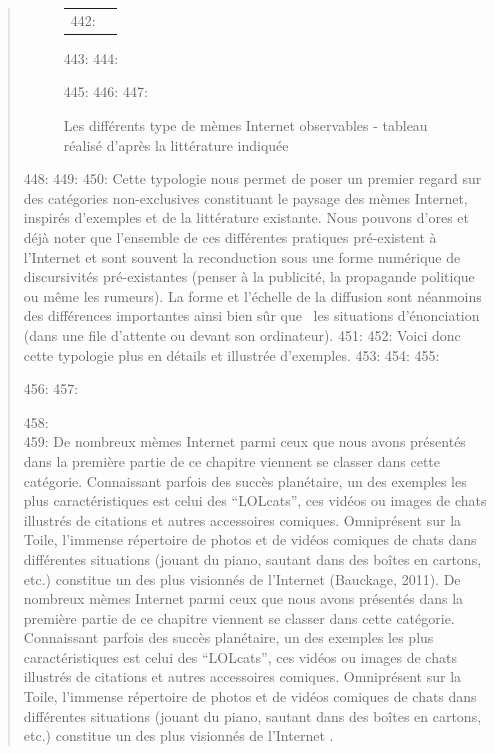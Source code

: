 \begin{quote}
\begin{figure}
\begin{tabular}{c|c}
442:     \end{tabular}
443: 
444: \caption[Typologie des mèmes]{Les diff\'erents type de m\`emes Internet observables - tableau r\'ealis\'e d{\textquoteright}apr\`es la litt\'erature indiqu\'ee}
445: \label{fig:typologie-memes}
446: 
447: \end{figure}
448: 
449: 
450: Cette typologie nous permet de poser un premier regard sur des cat\'egories non-exclusives constituant le paysage des m\`emes Internet, inspir\'es d{\textquoteright}exemples et de la litt\'erature existante. Nous pouvons d{\textquoteright}ores et d\'ej\`a noter que l{\textquoteright}ensemble de ces diff\'erentes pratiques pr\'e-existent \`a l{\textquoteright}Internet et sont souvent la reconduction sous une forme num\'erique de discursivit\'es pr\'e-existantes (penser \`a la publicit\'e, la propagande politique ou m\^eme les rumeurs). La forme et l{\textquoteright}\'echelle de la diffusion sont n\'eanmoins des diff\'erences importantes ainsi bien s\^ur que \ les situations d{\textquoteright}\'enonciation (dans une file d{\textquoteright}attente ou devant son ordinateur). 
451: 
452: Voici donc cette typologie plus en d\'etails et illustr\'ee d{\textquoteright}exemples. 
453: 
454: 
455: \begin{description}
456: 
457: \item[Absurdiste, humour]
458: \hfill \\
459: De nombreux m\`emes Internet parmi ceux que nous avons pr\'esent\'es dans la premi\`ere partie de ce chapitre viennent se classer dans cette cat\'egorie. Connaissant parfois des succ\`es plan\'etaire, un des exemples les plus caract\'eristiques est celui des {\textquotedblleft}LOLcats{\textquotedblright}, ces vid\'eos ou images de chats illustr\'es de citations et autres accessoires comiques. Omnipr\'esent sur la Toile, l{\textquoteright}immense r\'epertoire de photos et de vid\'eos comiques de chats dans diff\'erentes situations (jouant du piano, sautant dans des bo\^ites en cartons, etc.) constitue un des plus visionn\'es de l{\textquoteright}Internet (Bauckage, 2011). 
De nombreux m\`emes Internet parmi ceux que nous avons pr\'esent\'es dans la premi\`ere partie de ce chapitre viennent se classer dans cette cat\'egorie. Connaissant parfois des succ\`es plan\'etaire, un des exemples les plus caract\'eristiques est celui des {\textquotedblleft}LOLcats{\textquotedblright}, ces vid\'eos ou images de chats illustr\'es de citations et autres accessoires comiques. Omnipr\'esent sur la Toile, l{\textquoteright}immense r\'epertoire de photos et de vid\'eos comiques de chats dans diff\'erentes situations (jouant du piano, sautant dans des bo\^ites en cartons, etc.) constitue un des plus visionn\'es de l{\textquoteright}Internet \cite{Bauckage2011}. 

\end{description}
\end{quote}
